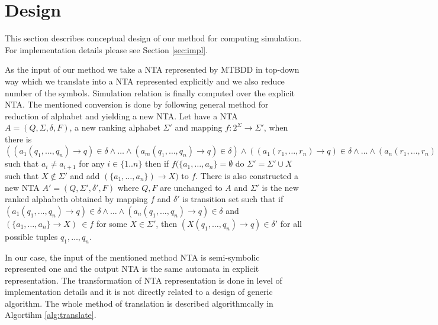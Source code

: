 \documentclass[a4paper, 12pt]{article}
\begin{document}
\section{Design}
\label{sec:design}

This section describes conceptual design of our method for computing simulation.
For implementation details please see Section \ref{sec:impl}.

As the input of our method we take a NTA represented by MTBDD in top-down way
which we translate into a NTA represented explicitly and we also reduce number of the symbols.
Simulation relation is finally computed over the explicit NTA.
The mentioned conversion is done by following general method for reduction of alphabet and yielding a new NTA.
Let have a NTA $A=(Q, \Sigma, \delta, F)$, a new ranking alphabet $\Sigma'$ and mapping $f: 2^\Sigma \rightarrow \Sigma'$,
when there is $((a_1(q_1,\ldots,q_n) \rightarrow q) \in \delta \wedge \ldots \wedge (a_m(q_1,\ldots,q_n) \rightarrow q) \in \delta) \wedge
((a_1(r_1,\ldots,r_n) \rightarrow q) \in \delta \wedge \ldots \wedge (a_n(r_1,\ldots,r_n) \rightarrow q) \in \delta)$
such that $a_i \neq a_{i+1}$ for any $i\in \{1..n\}$ then if $f(\{a_1,\ldots, a_n\} = \emptyset$ do $\Sigma' = \Sigma' \cup X$ such that $X \notin \Sigma'$
and add $(\{a_1, \ldots, a_n\}) \rightarrow X)$ to $f$.
There is also constructed a new NTA $A' = (Q, \Sigma', \delta', F)$ where $Q, F$ are unchanged to $A$ 
and $\Sigma'$ is the new ranked alphabeth obtained by mapping $f$ and $\delta'$ is transition set such that
if $(a_1(q_1, \ldots, q_n) \rightarrow q) \in \delta \wedge \ldots \wedge (a_n(q_1, \ldots, q_n) \rightarrow q) \in \delta$ and
$ (\{a_1,\ldots,a_n\}  \rightarrow X)~\in f$ for some $X \in \Sigma'$, then $(X(q_1, \ldots, q_n) \rightarrow q) \in \delta'$
for all possible tuples $q_1,\ldots,q_n$.

In our case, the input of the mentioned method NTA is semi-symbolic represented one and the output NTA is the same automata in explicit representation.
The transformation of NTA representation is done in level of implementation details and it is not directly related to a design of generic algorithm.
The whole method of translation is described algorithmcally in Algortihm \ref{alg:translate}.
\end{document}
